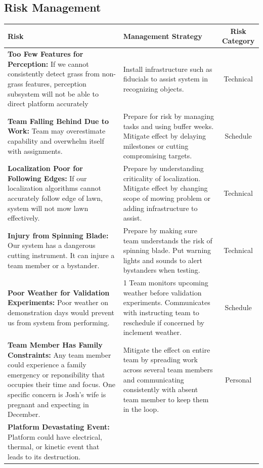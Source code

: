 \documentclass[12pt]{extarticle}
\begin{document}
\subsection{Risk Management}
\begin{tabular}{p{7cm}|p{6cm}|c}
\textbf{Risk} & \textbf{Management Strategy} & \textbf{Risk Category}\\
\hline
\textbf{Too Few Features for Perception:} 
If we cannot consistently detect grass from non-grass features, perception subsystem will not be able to direct platform accurately
&
Install infrastructure such as fiducials to assist system in recognizing objects.
&
Technical\\
\hline
\textbf{Team Falling Behind Due to Work:} 
Team may overestimate capability and overwhelm itself with assignments.
&
Prepare for risk by managing tasks and using buffer weeks.  Mitigate effect by delaying milestones or cutting compromising targets.
&
Schedule\\
\hline
\textbf{Localization Poor for Following Edges:} 
If our localization algorithms cannot accurately follow edge of lawn, system will not mow lawn effectively.
&
Prepare by understanding criticality of localization.  Mitigate effect by changing scope of mowing problem or adding infrastructure to assist.
&
Technical\\
\hline
\textbf{Injury from Spinning Blade:} 
Our system has a dangerous cutting instrument.  It can injure a team member or a bystander.
&
Prepare by making sure team understands the risk of spinning blade.  Put warning lights and sounds to alert bystanders when testing.
&
Technical\\
\hline
\textbf{Poor Weather for Validation Experiments:} 
Poor weather on demonstration days would prevent us from system from performing.
&1
Team monitors upcoming weather before validation experiments.  Communicates with instructing team to reschedule if concerned by inclement weather.
&
Schedule\\
\hline
\textbf{Team Member Has Family Constraints:} 
Any team member could experience a family emergency or reponsibility that occupies their time and focus.  One specific concern is Josh's wife is pregnant and expecting in December.
&
Mitigate the effect on entire team by spreading work across several team members and communicating consistently with absent team member to keep them in the loop.
&
Personal\\
\hline
\textbf{Platform Devastating Event:} 
Platform could have electrical, thermal, or kinetic event that leads to its destruction.

\end{tabular}
\end{document}
